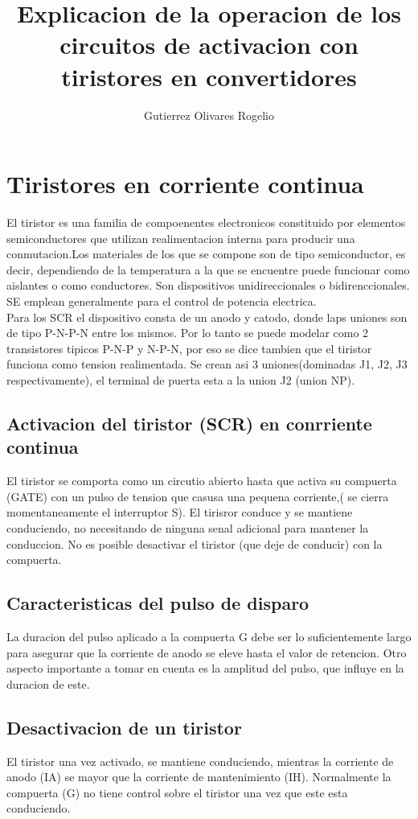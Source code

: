 \documentclass[12pt,a4paper]{report}
\author{Gutierrez Olivares Rogelio}
\title{Explicacion de la operacion de los circuitos de activacion con tiristores en convertidores}
\begin{document}
\maketitle
\chapter{Tiristores en corriente continua}
El tiristor es una familia de compoenentes electronicos constituido por elementos semiconductores que utilizan realimentacion interna para producir una conmutacion.Los materiales de los que se compone son de tipo semiconductor, es decir, dependiendo de la temperatura a la que se encuentre puede funcionar como aislantes o como conductores. Son dispositivos unidireccionales o bidirenccionales. SE emplean generalmente para el control de potencia electrica.
\\
Para los SCR el dispositivo consta de un anodo y catodo, donde laps uniones son de tipo P-N-P-N entre los mismos. Por lo tanto se puede modelar como 2 transistores tipicos P-N-P y N-P-N, por eso se dice tambien que el tiristor funciona como tension realimentada. Se crean asi 3 uniones(dominadas J1, J2, J3 respectivamente), el terminal de puerta esta a la union J2 (union NP).
\section{Activacion del tiristor (SCR) en conrriente continua }
El tiristor se comporta como un circutio abierto hasta que activa su compuerta (GATE) con un pulso de tension que casusa una pequena corriente,( se cierra momentaneamente el interruptor S). El tirisror conduce y se mantiene conduciendo, no necesitando de ninguna senal adicional para mantener la conduccion. No es posible desactivar el tiristor (que deje de conducir) con la compuerta.
\section{Caracteristicas del pulso de disparo}
La duracion del pulso aplicado a la compuerta G debe ser lo suficientemente largo para asegurar que la corriente de anodo se eleve hasta el valor de retencion. Otro aspecto importante a tomar en cuenta es la amplitud del pulso, que influye en la duracion de este.
\section{Desactivacion de un tiristor}
El tiristor una vez activado, se mantiene conduciendo, mientras la corriente de anodo (IA) se mayor que la corriente de mantenimiento (IH). Normalmente la compuerta (G) no tiene control sobre el tiristor una vez que este esta conduciendo.\\\\
\end{document}
